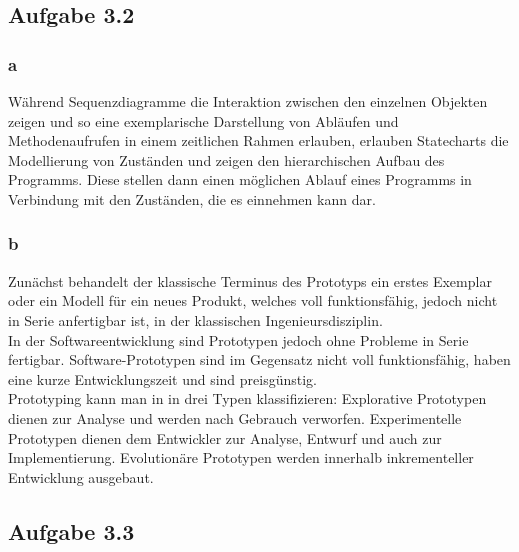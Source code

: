 \documentclass[a4paper,graphics,11pt]{article}
\newcommand\aufgabe[1]{\subsection*{Aufgabe #1}}
\newcommand\aufgabenteil[1]{\subsubsection*{#1}}
\begin{document}
\aufgabe{3.2}
\aufgabenteil{a}
W{\"a}hrend Sequenzdiagramme die Interaktion zwischen den einzelnen Objekten zeigen und so eine exemplarische Darstellung von Abl{\"a}ufen und Methodenaufrufen in einem zeitlichen Rahmen erlauben, erlauben Statecharts die Modellierung von Zust{\"a}nden und zeigen den hierarchischen Aufbau des Programms. Diese stellen dann einen m{\"o}glichen Ablauf eines Programms in Verbindung mit den Zust{\"a}nden, die es einnehmen kann dar.
\aufgabenteil{b}
Zun{\"a}chst behandelt der klassische Terminus des Prototyps ein erstes Exemplar oder ein Modell f{\"u}r ein neues Produkt, welches voll funktionsf{\"a}hig, jedoch nicht in Serie anfertigbar ist, in der klassischen Ingenieursdisziplin.\\
In der Softwareentwicklung sind Prototypen jedoch ohne Probleme in Serie fertigbar. Software-Prototypen sind im Gegensatz nicht voll funktionsf{\"a}hig, haben eine kurze Entwicklungszeit und sind preisg{\"u}nstig.\\
Prototyping kann man in in drei Typen klassifizieren: Explorative Prototypen dienen zur Analyse und werden nach Gebrauch verworfen. Experimentelle Prototypen dienen dem Entwickler zur Analyse, Entwurf und auch zur Implementierung. Evolution{\"a}re Prototypen werden innerhalb inkrementeller Entwicklung ausgebaut.
\aufgabe{3.3}
\end{document}
